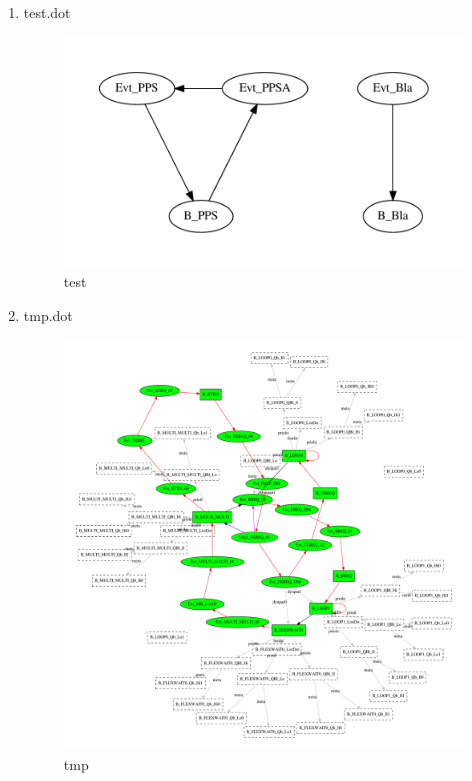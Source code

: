 \documentclass[12pt,a4paper]{report}
\begin{document}
\begin{enumerate}
\item test.dot
    \begin{figure}
        \centering 
        \includegraphics*[width=1.0\textwidth,keepaspectratio]{TestPattern/test.pdf}
        \caption{test}
        \label{fig:test}
    \end{figure}
\item tmp.dot
    \begin{figure}
        \centering 
        \includegraphics*[width=1.0\textwidth,keepaspectratio]{TestPattern/tmp.pdf}
        \caption{tmp}
        \label{fig:tmp}
    \end{figure}

\end{enumerate}
\end{document}
